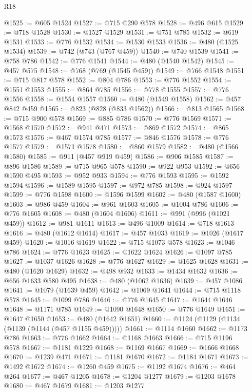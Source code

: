 \begin{lexlean}{R18}
\begin{coremodule}
@1525 := @605 @1524
@1527 := @715 @290 @578
@1528 := @496 @615
@1529 := @718 @1528
@1530 := @1527 @1529
@1531 := @751 @785
@1532 := @619 @1531
@1533 := @776 @1532
@1534 := @1530 @1533
@1536 := @480 (@1525 @1534)
@1539 := @742 (@743 (@767 @459))
@1540 := @740 @1539
@1541 := @758 @786
@1542 := @776 @1541
@1544 := @480 (@1540 @1542)
@1545 := @457 @575
@1548 := @768 (@769 (@1545 @459))
@1549 := @766 @1548
@1551 := @715 @817 @578
@1552 := @804 @786
@1553 := @776 @1552
@1554 := @1551 @1553
@1555 := @864 @785
@1556 := @778 @1555
@1557 := @776 @1556
@1558 := @1554 @1557
@1560 := @480 (@1549 @1558)
@1562 := @457 @842 @459
@1565 := @823 (@828 (@833 @1562))
@1566 := @813 @1565
@1568 := @715 @900 @578
@1569 := @885 @786
@1570 := @776 @1569
@1571 := @1568 @1570
@1572 := @941 @471
@1573 := @869 @1572
@1574 := @865 @1573
@1576 := @467 @1574 @785
@1577 := @846 @1576
@1578 := @776 @1577
@1579 := @1571 @1578
@1580 := @860 @1579
@1582 := @480 (@1566 @1580)
@1585 := @911 (@457 @919 @459)
@1586 := @906 @1585
@1587 := @896 @1586
@1589 := @715 @965 @578
@1590 := @922 @953
@1592 := @656 @1590 @495
@1593 := @952 @933
@1594 := @776 @1593
@1595 := @1592 @1594
@1596 := @1589 @1595
@1597 := @972 @785
@1598 := @924 @1597
@1599 := @776 @1598
@1600 := @1596 @1599
@1602 := @480 (@1587 @1600)
@1603 := @986 @459
@1604 := @961 @1603
@1605 := @1004 @786
@1606 := @776 @1605
@1608 := @480 (@1604 @1606)
@1611 := @991 (@996 (@1021 @459))
@1612 := @981 @1611
@1613 := @496 @1009
@1614 := @718 @1613
@1616 := @480 (@1612 @1614)
@1617 := @457 @1033
@1619 := @1026 (@1617 @459)
@1620 := @1016 @1619
@1622 := @715 @1073 @578
@1623 := @1046 @786
@1624 := @776 @1623
@1625 := @1622 @1624
@1626 := @1097 @785
@1627 := @1037 @1626
@1628 := @776 @1627
@1629 := @1625 @1628
@1631 := @480 (@1620 @1629)
@1632 := @498 @932
@1633 := @1434 @1632
@1636 := @656 @1633 @580 @495
@1638 := @480 (@1062 @1636)
@1639 := @457 @1086
@1641 := @1079 (@1639 @459)
@1642 := @1069 @1641
@1644 := @715 @1118 @578
@1645 := @1099 @786
@1646 := @776 @1645
@1647 := @1644 @1646
@1648 := @1171 @785
@1649 := @1090 @1648
@1650 := @776 @1649
@1651 := @1647 @1650
@1653 := @480 (@1642 @1651)
@1660 := @1124 (@1129 (@1134 (@1139 (@1144 (@457 @1155 @459)))))
@1661 := @1114 @1660
@1662 := @1173 @786
@1663 := @776 @1662
@1664 := @1168 @1663
@1666 := @715 @1196 @578
@1667 := @1181 @1229
@1668 := @1169 @1667
@1669 := @1666 @1668
@1670 := @1239 @471
@1671 := @1181 @1670
@1672 := @1184 @1671
@1673 := @1492 @1672
@1674 := @1260 @459
@1675 := @1192 @1674
@1676 := @464 @264
@1677 := @467 @1205
@1678 := @1204 @1277
@1679 := @1203 @1678
@1680 := @467 @1679
@1681 := @1203 @1277

\end{coremodule}
\end{lexlean}
